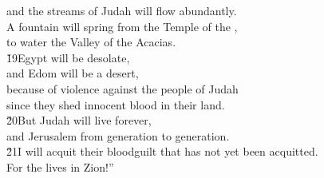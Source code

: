 \begin{poetry}
\poemll    and the streams of Judah will flow abundantly. \\
\poeml A fountain will spring from the Temple of the , \\
\poemll    to water the Valley of the Acacias. \\
\poeml \v{19}Egypt will be desolate, \\
\poemll    and Edom will be a desert, \\
\poeml because of violence against the people of Judah \\
\poemll    since they shed innocent blood in their land. \\
\poeml \v{20}But Judah will live forever, \\
\poemll    and Jerusalem from generation to generation. \\
\poeml \v{21}I will acquit their bloodguilt that has not yet been acquitted. \\
\poemll    For the  lives in Zion!''\end{poetry}
